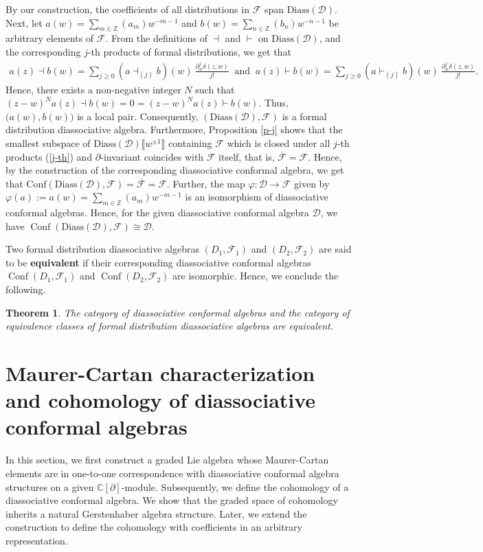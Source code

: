 \documentclass[a4paper,reqno,10pt]{amsart}
\theoremstyle{plain}
\newtheorem{theorem}[thm]{Theorem}
\theoremstyle{definition}
\theoremstyle{remark}
\newcommand{\C}{\mathbb{C}}
\newcommand{\D}{\mathcal{D}}
\newcommand{\p}{\partial}
\begin{document}
By our construction, the coefficients of all distributions in $\mathcal{F}$ span $\mathrm{Diass} (\D)$. Next, let $a(w)=\sum \limits_{m\in\mathbb Z}(a_m)w^{-m-1}$ and
$b(w)=\sum \limits_{n\in\mathbb Z}(b_n)w^{-n-1}$ be arbitrary elements of $\mathcal{F}$. From the definitions of $\dashv$ and $\vdash$ on $\mathrm{Diass} (\D)$, and the corresponding $j$-th products of formal distributions, we get that
\begin{align*}
a(z)\dashv b(w)
=\sum_{j\geq 0}(a\dashv_{(j)}b)(w) ~ \! 
\frac{\partial_w^j\delta(z,w)}{j!}~\text{ and }~
a(z)\vdash b(w)
=\sum_{j\geq 0}(a\vdash_{(j)}b)(w) ~ \!
\frac{\partial_w^j\delta(z,w)}{j!}.
\end{align*}
Hence, there exists a non-negative integer $N$ such that $(z-w)^N a(z)\dashv b(w)=0=(z-w)^N a(z)\vdash b(w)$. Thus, $\big(a(w),b(w)\big)$ is a local pair. Consequently, $(\mathrm{Diass} (\D) ,\mathcal{F})$ is a formal distribution diassociative algebra. Furthermore, Proposition \ref{p-j} shows that the smallest subspace of $\mathrm{Diass} (\D) \llbracket w^{\pm 1 }\rrbracket$ containing $\mathcal{F}$ which is closed under all $j$-th products (\ref{j-th}) and $\p$-invariant coincides with $\mathcal{F}$ itself, that is, $\overline{\mathcal{F}}=\mathcal{F}.$ Hence, by the construction of the corresponding diassociative conformal algebra, we get that $\text{Conf} ( \mathrm{Diass} (\D) ,\mathcal{F})=\overline{\mathcal{F}}=\mathcal{F}. $ Further, the map $\varphi:\mathcal{D}\rightarrow\mathcal{F}$ given by $\varphi(a) :=a(w)=\sum \limits_{m\in\mathbb Z}(a_m)w^{-m-1}$ is an isomorphism of diassociative conformal algebras. Hence, for the given diassociative conformal algebra $\mathcal{D}$, we have $ \operatorname{Conf}(\mathrm{Diass} (\D) , \mathcal{F}) \cong \D. $  

\medskip
    
    Two formal distribution diassociative algebras $(D_1,\mathcal{F}_1)$ and $(D_2,\mathcal{F}_2)$ are said to be {\bf equivalent} if their corresponding diassociative conformal algebras $\operatorname{Conf}(D_1,\mathcal{F}_1)$ and $\operatorname{Conf}(D_2,\mathcal{F}_2)$ are isomorphic. Hence, we conclude the following.

\begin{theorem}\label{thm-categ-equiv}
    The category of diassociative conformal algebras and the category of equivalence classes of formal distribution diassociative algebras are equivalent.
\end{theorem}


\section{Maurer-Cartan characterization and cohomology of diassociative conformal algebras}\label{sec3} In this section, we first construct a graded Lie algebra whose Maurer-Cartan elements are in one-to-one correspondence with diassociative conformal algebra structures on a given $\C [\partial]$-module. Subsequently, we define the cohomology of a diassociative conformal algebra. We show that the graded space of cohomology inherits a natural Gerstenhaber algebra structure. Later, we extend the construction to define the cohomology with coefficients in an arbitrary representation.
\end{document}
